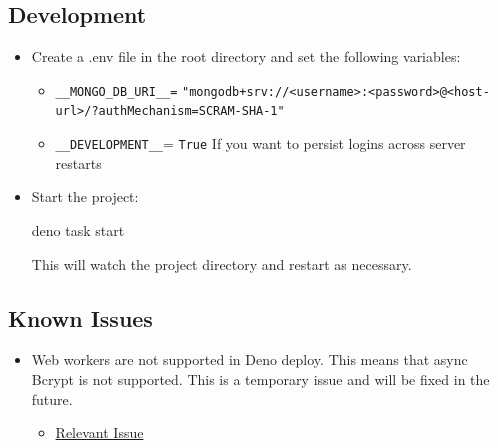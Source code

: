 \documentclass[
]{article}
\newenvironment{Shaded}{}{}
\newcommand{\ExtensionTok}[1]{#1}
\newcommand{\NormalTok}[1]{#1}
\providecommand{\tightlist}{%
  \setlength{\itemsep}{0pt}\setlength{\parskip}{0pt}}
\begin{document}
\hypertarget{development}{%
  \subsection{Development}\label{development}}

\begin{itemize}
  \tightlist
  \item
        Create a .env file in the root directory and set the following
        variables:

        \begin{itemize}
          \item
                \texttt{\_\_MONGO\_DB\_URI\_\_=} \linebreak
                \texttt{"mongodb+srv://\textless{}username\textgreater{}:\textless{}password\textgreater{}@\textless{}host-url\textgreater{}\linebreak/?authMechanism=SCRAM-SHA-1"}
          \item
                \texttt{\_\_DEVELOPMENT\_\_}= \texttt{True} If you want to persist
                logins across server restarts
        \end{itemize}
  \item
        Start the project:
        \begin{Shaded}
          \begin{Highlighting}[]
            \ExtensionTok{deno}\NormalTok{ task start}
          \end{Highlighting}
        \end{Shaded}
        This will watch the project directory and restart as necessary.
\end{itemize}

\hypertarget{known-issues}{%
  \subsection{Known Issues}\label{known-issues}}

\begin{itemize}
  \tightlist
  \item
        Web workers are not supported in Deno deploy. This means that async
        Bcrypt is not supported. This is a temporary issue and will be fixed
        in the future.

        \begin{itemize}
          \tightlist
          \item
                \href{https://github.com/JamesBroadberry/deno-bcrypt/issues/26}{Relevant
                  Issue}
        \end{itemize}
\end{itemize}
\end{document}
